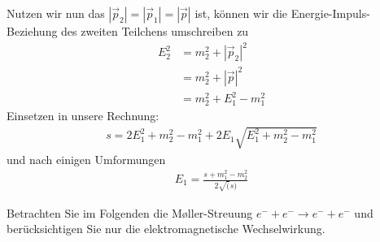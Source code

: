 \begin{enumerate}[label=\alph*)]
{ Nutzen wir nun das $|\vec{p}_2| = |\vec{p}_1| = |\vec{p}|$ ist, können wir die Energie-Impuls-Beziehung des zweiten Teilchens umschreiben zu
 \begin{align*}
 E^2_2 &= m^2_2 + |\vec{p}_2|^2\\
       &= m^2_2 + |\vec{p}|^2\\
       &= m^2_2 + E^2_1 - m^2_1
 \end{align*}
 Einsetzen in unsere Rechnung:
 \begin{align*}
     s = 2E^2_1 + m^2_2 - m^2_1 + 2E_1\sqrt{E^2_1 + m^2_2 - m^2_1}
 \end{align*}
 und nach einigen Umformungen
 \begin{align*}
     E_1 = \frac{s + m^2_1 - m^2_2}{2\sqrt(s)}
 \end{align*}
 }
\end{enumerate}
%
Betrachten Sie im Folgenden die M\o ller-Streuung $e^- + e^- \rightarrow e^- + e^-$ und berücksichtigen Sie nur die elektromagnetische Wechselwirkung.
%
